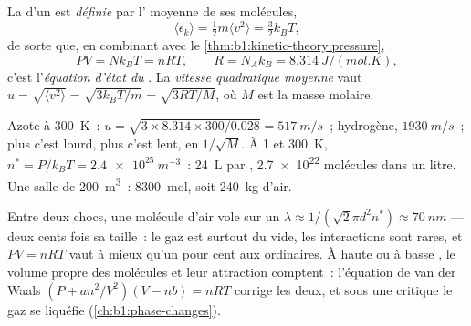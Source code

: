 \begin{definition}\label{def:b1:kinetic-theory:kinetictemp}
La  d'un  est \emph{définie} par l' moyenne de ses molécules,
\[
\langle\epsilon_k\rangle = \tfrac12 m\langle v^2\rangle = \tfrac32 k_BT ,
\]
de sorte que, en combinant avec le \cref{thm:b1:kinetic-theory:pressure},
\[
PV = Nk_BT = nRT, \qquad R = N_Ak_B = \qty{8.314}{J/(mol.K)} ,
\]
c'est l'\emph{équation d'état du }. La \emph{vitesse
quadratique moyenne} vaut $u = \sqrt{\langle v^2\rangle} = \sqrt{3k_BT/m} = \sqrt{3RT/M}$,
où $M$ est la masse molaire.
\end{definition}

\begin{example}\label{ex:b1:kinetic-theory:air}
Azote à \qty{300}{K}~: $u = \sqrt{3 \times 8.314 \times 300/0.028} =
\qty{517}{m/s}$~; hydrogène, $\qty{1930}{m/s}$~; plus c'est lourd, plus
c'est lent, en $1/\sqrt M$. À \qty{1}{} et \qty{300}{K}, $n^* = P/k_BT = \qty{2.4e25}{m^{-3}}$~:
\qty{24}{L} par , \qty{2.7e22}{} molécules dans un litre. Une salle
de \qty{200}{m^3}~: \qty{8300}{mol}, soit \qty{240}{kg} d'air.
\end{example}

\begin{remark}\label{rem:b1:kinetic-theory:validity}
Entre deux chocs, une molécule d'air vole sur un \emph{} $\lambda \approx 1/(\sqrt2\pi d^2n^*) \approx \qty{70}{nm}$ ---
deux cents fois sa taille~: le gaz est surtout du vide, les interactions
sont rares, et $PV = nRT$ vaut à mieux qu'un pour cent aux 
ordinaires. À haute  ou à basse , le volume propre
des molécules et leur attraction comptent~: l'équation de van der Waals
$(P + an^2/V^2)(V - nb) = nRT$ corrige les deux, et sous une 
critique le gaz se liquéfie (\cref{ch:b1:phase-changes}).
\end{remark}

